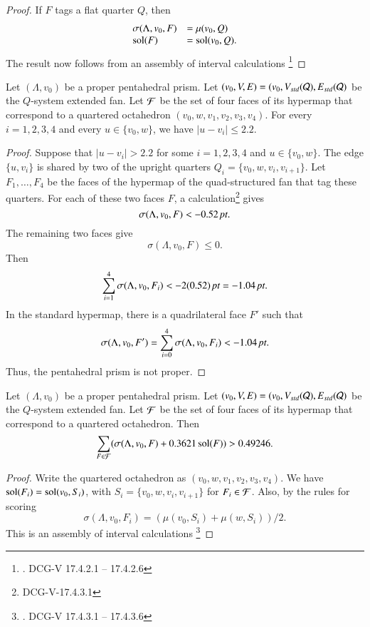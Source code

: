 \begin{proof} If $F$ tags a flat quarter $Q$, then
$$
\begin{array}{lll}
   \sigma(\Lambda,v_0,F) &= \mu(v_0,Q)  \\
   \operatorname{sol}(F) &= \operatorname{sol}(v_0,Q).
\end{array}
$$
The result now follows from an assembly of interval calculations%
\footnote{. DCG-V 17.4.2.1 -- 17.4.2.6}
\end{proof}

\begin{lemma}
Let $(\Lambda,v_0)$ be a proper pentahedral prism.  
Let $(v_0,V,E) = (v_0,V_{std}({\mathcal Q}),E_{std}({\mathcal Q})$ be the $Q$-system
extended fan.
Let ${\mathcal F}$ be the set
of four faces of its hypermap that correspond to a quartered octahedron
$(v_0,w,v_1,v_2,v_3,v_4)$.  For every $i=1,2,3,4$ and
every $u\in\{v_0,w\}$, we have $|u-v_i|\le 2.2$.  
\end{lemma}

\begin{proof}
Suppose that $|u-v_i|>2.2$ for some $i=1,2,3,4$ and $u\in\{v_0,w\}$.
The edge $\{u,v_i\}$ is shared by two of the upright quarters
$Q_i = \{v_0,w,v_i,v_{i+1}\}$.  Let $F_1,\ldots,F_4$ be the faces
of the hypermap of the quad-structured fan that tag these quarters.
For each of these two faces $F$, a
calculation\footnote{ DCG-V-17.4.3.1} gives 
  $$\sigma(\Lambda,v_0,F) < -0.52\,\hbox{\it pt}.$$
The remaining two faces give $$\sigma(\Lambda,v_0,F)\le 0.$$
Then $$\sum_{i=1}^4\sigma(\Lambda,v_0,F_i) < -2(0.52)\,\hbox{\it pt} = -1.04\,\hbox{\it pt}.$$
In the standard hypermap, there is a quadrilateral face $F'$ such that 
  $$\sigma(\Lambda,v_0,F') = \sum^4_{i=0}\sigma(\Lambda,v_0,F_i) <
   -1.04\,\hbox{\it pt}.$$
Thus, the pentahedral prism is not proper.
\end{proof}

\begin{lemma}
Let $(\Lambda,v_0)$ be a proper pentahedral prism.
Let $(v_0,V,E) = (v_0,V_{std}({\mathcal Q}),E_{std}({\mathcal Q})$ be the $Q$-system
extended fan.
Let ${\mathcal F}$ be the set
of four faces of its hypermap that correspond to a quartered octahedron.
Then
   $$\sum_{F\in{\mathcal F}}(\sigma(\Lambda,v_0,F) + 0.3621 \operatorname{sol}(F)) > 0.49246.$$
\end{lemma}

\begin{proof}
Write the quartered octahedron as $(v_0,w,v_1,v_2,v_3,v_4)$.  We
have $\operatorname{sol}(F_i) = \operatorname{sol}(v_0,S_i)$, with $S_i=\{v_0,w,v_i,v_{i+1}\}$ for
$F_i\in {\mathcal F}$.  Also, by the rules for scoring
  $$\sigma(\Lambda,v_0,F_i) = (\mu(v_0,S_i) + \mu(w,S_i))/2.$$
This is an assembly of interval calculations%
\footnote{. DCG-V 17.4.3.1 -- 17.4.3.6}
\end{proof}

